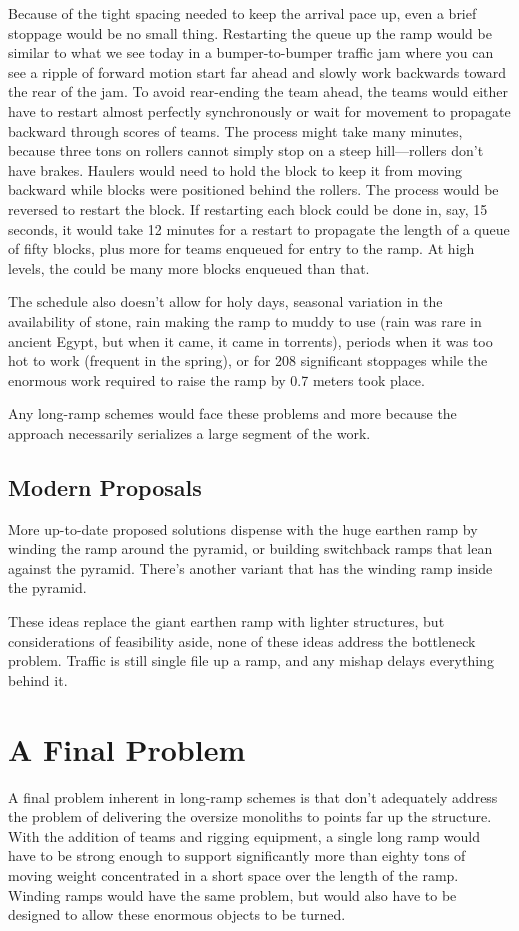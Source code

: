 \documentclass[letterpaper,11pt]{article}
\begin{document}
Because of the tight spacing needed to keep the arrival pace up, even a brief stoppage would be no small thing. 
Restarting the queue up the ramp would be similar to what we see today in a bumper-to-bumper traffic jam where you can 
see a ripple of forward motion start far ahead and slowly work backwards toward the rear of the jam.
To avoid rear-ending the team ahead, the teams would either have to restart almost perfectly synchronously
or wait for movement to propagate backward through scores of teams. 
The process might take many minutes, because three tons on rollers cannot simply stop on a steep hill---rollers don't have brakes.
Haulers would need to hold the block to keep it from moving backward while blocks were positioned behind the rollers. 
The process would be reversed to restart the block.
If restarting each block could be done in, say, 15 seconds, it would take 12 minutes for a restart to propagate the length of
a queue of fifty blocks, plus more for teams enqueued for entry to the ramp. 
At high levels, the could be many more blocks enqueued than that.

The schedule also doesn't allow for holy days, seasonal variation in the availability of stone, rain making
the ramp to muddy to use (rain was rare in ancient Egypt, but when it came, it came in torrents), periods when 
it was too hot to work (frequent in the spring), or for 208 significant stoppages while the enormous work required to raise the 
ramp by 0.7 meters took place. 

Any long-ramp schemes would face these problems and more because the approach necessarily serializes a 
large segment of the work. 
 

\subsection{ Modern Proposals}
More up-to-date proposed solutions dispense with the huge earthen ramp by winding the ramp around the pyramid, or building switchback ramps that lean against the pyramid. 
There's another variant that has the winding ramp inside the pyramid. 

These ideas replace the giant earthen ramp with lighter structures, but considerations of feasibility aside, none of these ideas address the bottleneck problem.  
Traffic is still single file up a ramp, and any mishap delays everything behind it.


\section{ A Final Problem }
A final problem inherent in long-ramp schemes is that don't adequately address the problem of delivering the oversize monoliths 
to points far up the structure. 
With the addition of teams and rigging equipment, a single long ramp would have to be strong enough to support significantly more 
than eighty tons of moving weight concentrated in a short space over the length of the ramp. 
Winding ramps would have the same problem, but would also have to be designed to allow these enormous objects to be turned.
\end{document}
